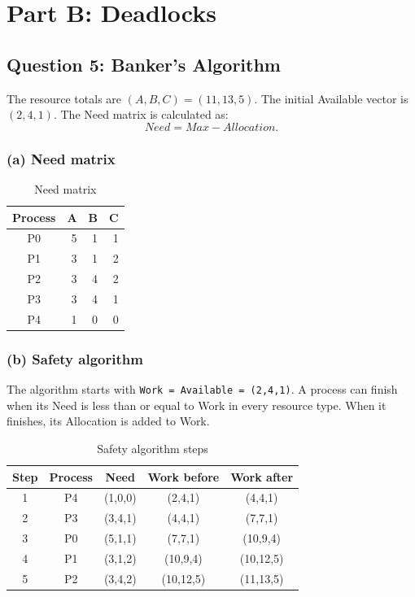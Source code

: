 \documentclass[conference]{IEEEtran}
\begin{document}
\section{Part B: Deadlocks}

\subsection{Question 5: Banker's Algorithm}

The resource totals are \((A,B,C)=(11,13,5)\). The initial Available vector is \((2,4,1)\). The Need matrix is calculated as:
\[
Need = Max - Allocation.
\]

\subsubsection{(a) Need matrix}
\begin{table}[H]
\centering
\caption{Need matrix}
\begin{tabular}{c|rrr}
Process & A & B & C\\ \hline
P0 & 5 & 1 & 1\\
P1 & 3 & 1 & 2\\
P2 & 3 & 4 & 2\\
P3 & 3 & 4 & 1\\
P4 & 1 & 0 & 0
\end{tabular}
\end{table}

\subsubsection{(b) Safety algorithm}
The algorithm starts with \texttt{Work = Available = (2,4,1)}. A process can finish when its Need is less than or equal to Work in every resource type. When it finishes, its Allocation is added to Work.

\begin{table}[H]
\centering
\caption{Safety algorithm steps}
\small
\begin{tabular}{c|c|c|c|c}
Step & Process & Need & Work before & Work after\\ \hline
1 & P4 & (1,0,0) & (2,4,1) & (4,4,1)\\
2 & P3 & (3,4,1) & (4,4,1) & (7,7,1)\\
3 & P0 & (5,1,1) & (7,7,1) & (10,9,4)\\
4 & P1 & (3,1,2) & (10,9,4) & (10,12,5)\\
5 & P2 & (3,4,2) & (10,12,5) & (11,13,5)
\end{tabular}
\end{table}
\end{document}
